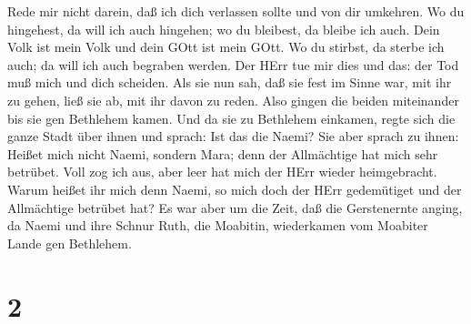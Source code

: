 Rede mir nicht darein, daß ich dich verlassen sollte und von dir
umkehren. Wo du hingehest, da will ich auch hingehen; wo du bleibest, da
bleibe ich auch. Dein Volk ist mein Volk und dein GOtt ist mein GOtt.
 Wo du stirbst, da sterbe ich auch; da will ich auch
begraben werden. Der HErr tue mir dies und das: der Tod muß mich und
dich scheiden.  Als sie nun sah, daß sie fest im Sinne war,
mit ihr zu gehen, ließ sie ab, mit ihr davon zu reden. 
Also gingen die beiden miteinander bis sie gen Bethlehem kamen. Und da
sie zu Bethlehem einkamen, regte sich die ganze Stadt über ihnen und
sprach: Ist das die Naemi?  Sie aber sprach zu ihnen:
Heißet mich nicht Naemi, sondern Mara; denn der Allmächtige hat mich
sehr betrübet.  Voll zog ich aus, aber leer hat mich der
HErr wieder heimgebracht. Warum heißet ihr mich denn Naemi, so mich doch
der HErr gedemütiget und der Allmächtige betrübet hat?  Es
war aber um die Zeit, daß die Gerstenernte anging, da Naemi und ihre
Schnur Ruth, die Moabitin, wiederkamen vom Moabiter Lande gen Bethlehem.

\hypertarget{section-1}{%
\section{2}\label{section-1}}

